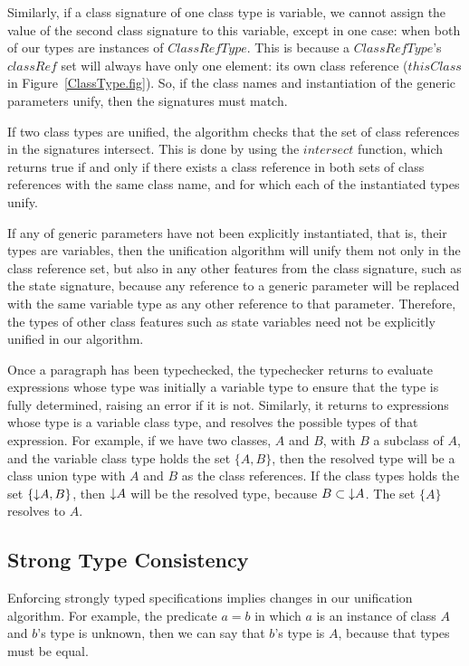 Similarly, if a class signature of one class type is variable, we
cannot assign the value of the second class signature to this
variable, except in one case: when both of our types are instances of
$ClassRefType$. This is because a $ClassRefType$'s $classRef$ set will
always have only one element: its own class reference ($thisClass$ in
Figure~\ref{ClassType.fig}). So, if the class names and instantiation
of the generic parameters unify, then the signatures must match.

If two class types are unified, the algorithm checks that the set of
class references in the signatures intersect. This is done by using
the $intersect$ function, which returns true if and only if
there exists a class reference in both sets of class references with
the same class name, and for which each of the instantiated types
unify.

If any of generic parameters have not been explicitly instantiated,
that is, their types are variables, then the unification algorithm
will unify them not only in the class reference set, but also in any
other features from the class signature, such as the state signature,
because any reference to a generic parameter will be replaced with the
same variable type as any other reference to that
parameter. Therefore, the types of other class features such as state
variables need not be explicitly unified in our algorithm.

Once a paragraph has been typechecked, the typechecker returns to
evaluate expressions whose type was initially a variable type to
ensure that the type is fully determined, raising an error if it is
not. Similarly, it returns to expressions whose type is a variable
class type, and resolves the possible types of that expression. For
example, if we have two classes, $A$ and $B$, with $B$ a subclass of
$A$, and the variable class type holds the set $\{A, B\}$, then the
resolved type will be a class union type with $A$ and $B$ as the class
references. If the class types holds the set $\{\mathord\downarrow A, B\}$, then
$\mathord\downarrow A$ will be the resolved type, because $B \subset \mathord\downarrow A$. The
set $\{A\}$ resolves to $A$.

\subsection{Strong Type Consistency}

Enforcing strongly typed specifications implies changes in our
unification algorithm.  For example, the predicate $a = b$ in which
$a$ is an instance of class $A$ and $b$'s type is unknown, then we can
say that $b$'s type is $A$, because that types must be equal.

